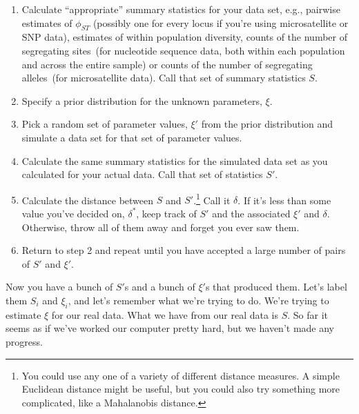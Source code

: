 \begin{enumerate}

\item Calculate ``appropriate'' summary statistics for your data set,
  e.g., pairwise estimates of $\phi_{ST}$ (possibly one for every
  locus if you're using microsatellite or SNP data), estimates of
  within population diversity, counts of the number of segregating
  sites~(for nucleotide sequence data, both within each population and
  across the entire sample) or counts of the number of segregating
  alleles~(for microsatellite data). Call that set of summary
  statistics $S$.

\item Specify a prior distribution for the unknown parameters, $\xi$.

\item Pick a random set of parameter values, $\xi'$ from the prior
  distribution and simulate a data set for that set of parameter
  values.

\item Calculate the same summary statistics for the simulated
  data set as you calculated for your actual data. Call that set of
  statistics $S'$. 

\item Calculate the distance between $S$ and $S'$.\footnote{You could
    use any one of a variety of different distance measures. A simple
    Euclidean distance might be useful, but you could also try
    something more complicated, like a Mahalanobis distance.} Call it
  $\delta$. If it's less than some value you've decided on,
  $\delta^*$, keep track of $S'$ and the associated $\xi'$ and
  $\delta$. Otherwise, throw all of them away and forget you ever saw
  them.

\item Return to step 2 and repeat until you have accepted a large
  number of pairs of $S'$ and $\xi'$.

\end{enumerate}

Now you have a bunch of $S'$s and a bunch of $\xi'$s that produced
them. Let's label them $S_i$ and $\xi_i$, and let's remember what
we're trying to do. We're trying to estimate $\xi$ for our real
data. What we have from our real data is $S$. So far it seems as if
we've worked our computer pretty hard, but we haven't made any
progress. 

